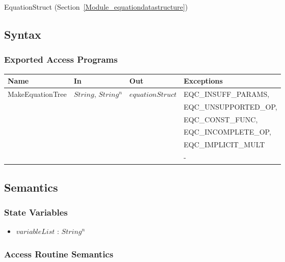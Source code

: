 \documentclass[12pt, titlepage]{article}
\begin{document}
EquationStruct (Section~\ref{Module_equationdatastructure})

\subsection{Syntax}

\subsubsection{Exported Access Programs}

\begin{center}
	\begin{tabular}{p{3.2cm} p{2.8cm} p{3cm} p{5cm}}
		\hline
		\textbf{Name} & \textbf{In} & \textbf{Out} & \textbf{Exceptions} \\
		\hline
		\multirow{6}{3.2cm}{MakeEquationTree} & \multirow{6}{2.8cm}{$String$, 
		$String^n$} & \multirow{6}{3cm}{$equationStruct$} & 
		EQC\_INSUFF\_PARAMS, \\
		& & & EQC\_UNSUPPORTED\_OP, \\
		& & & EQC\_CONST\_FUNC, \\
		& & & EQC\_INCOMPLETE\_OP, \\
		& & & EQC\_IMPLICIT\_MULT \\
		GetVariableList & - & $String^n$ & - \\
		\hline
	\end{tabular}
\end{center}

\subsection{Semantics}

\subsubsection{State Variables}

\begin{itemize}
	\item $variableList$ : $String^n$
\end{itemize}

\subsubsection{Access Routine Semantics}
\end{document}
